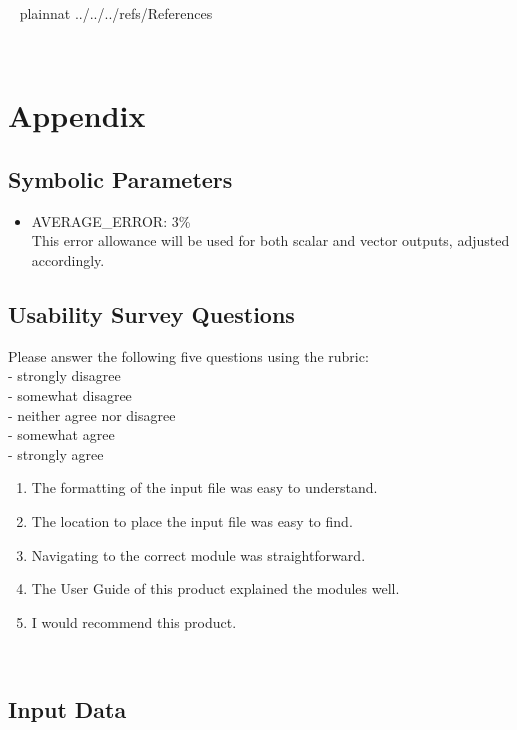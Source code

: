 \documentclass[12pt, titlepage]{article}
\begin{document}
~\newpage
\clearpage
 {plainnat}
 {../../../refs/References}

~\newpage


\section{Appendix}


\subsection{Symbolic Parameters}
\label{symbolpara}
\begin{itemize}

\item[\label{Cons_AVERAGE_ERROR}]AVERAGE\_ERROR: 3\%\\This error allowance will be used for both scalar and vector outputs, adjusted accordingly.

\end{itemize}

\subsection{Usability Survey Questions}
\label{usabilitysurevyquestions}
Please answer the following five questions using the rubric:\\
\linebreak
{} - strongly disagree\\
 - somewhat disagree\\
 - neither agree nor disagree\\
 - somewhat agree\\
 - strongly agree\\

\begin{enumerate}
\item The formatting of the input file was easy to understand.
\item The location to place the input file was easy to find.
\item Navigating to the correct module was straightforward.
\item The User Guide of this product explained the modules well.
\item I would recommend this product.
\end{enumerate}

~\newpage
\subsection{Input Data}
\label{inputdata}
\end{document}
